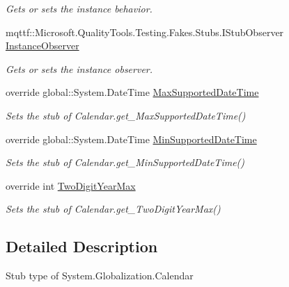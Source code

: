 \begin{DoxyCompactItemize}
\begin{DoxyCompactList}\small\item\em Gets or sets the instance behavior.\end{DoxyCompactList}\item 
mqttf\-::\-Microsoft.\-Quality\-Tools.\-Testing.\-Fakes.\-Stubs.\-I\-Stub\-Observer \hyperlink{class_system_1_1_globalization_1_1_fakes_1_1_stub_calendar_aa1d91bf8cfd679fd05f66cdaedec04cd}{Instance\-Observer}
\begin{DoxyCompactList}\small\item\em Gets or sets the instance observer.\end{DoxyCompactList}\item 
override global\-::\-System.\-Date\-Time \hyperlink{class_system_1_1_globalization_1_1_fakes_1_1_stub_calendar_a526401ab9862cd7a521f8493717eaa71}{Max\-Supported\-Date\-Time}
\begin{DoxyCompactList}\small\item\em Sets the stub of Calendar.\-get\-\_\-\-Max\-Supported\-Date\-Time()\end{DoxyCompactList}\item 
override global\-::\-System.\-Date\-Time \hyperlink{class_system_1_1_globalization_1_1_fakes_1_1_stub_calendar_af1e0365596225cf49004e95fea565476}{Min\-Supported\-Date\-Time}
\begin{DoxyCompactList}\small\item\em Sets the stub of Calendar.\-get\-\_\-\-Min\-Supported\-Date\-Time()\end{DoxyCompactList}\item 
override int \hyperlink{class_system_1_1_globalization_1_1_fakes_1_1_stub_calendar_a7a91c28e91cb8174870b99c49d525f52}{Two\-Digit\-Year\-Max}
\begin{DoxyCompactList}\small\item\em Sets the stub of Calendar.\-get\-\_\-\-Two\-Digit\-Year\-Max()\end{DoxyCompactList}\end{DoxyCompactItemize}


\subsection{Detailed Description}
Stub type of System.\-Globalization.\-Calendar



